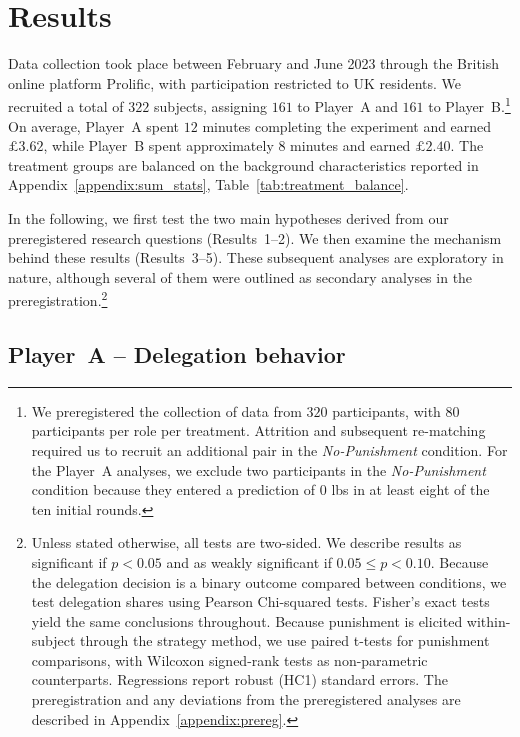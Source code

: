 \section{Results} \label{results}

Data collection took place between February and June 2023 through the British online platform Prolific, with participation restricted to UK residents. We recruited a total of $322$ subjects, assigning $161$ to Player~A and $161$ to Player~B.\footnote{We preregistered the collection of data from $320$ participants, with $80$ participants per role per treatment. Attrition and subsequent re-matching required us to recruit an additional pair in the \textit{No-Punishment} condition. For the Player~A analyses, we exclude two participants in the \textit{No-Punishment} condition because they entered a prediction of $0$ lbs in at least eight of the ten initial rounds.} On average, Player~A spent $12$ minutes completing the experiment and earned $\pounds 3.62$, while Player~B spent approximately $8$ minutes and earned $\pounds 2.40$. The treatment groups are balanced on the background characteristics reported in Appendix~\ref{appendix:sum_stats}, Table~\ref{tab:treatment_balance}.

In the following, we first test the two main hypotheses derived from our preregistered research questions (Results~1--2). We then examine the mechanism behind these results (Results~3--5). These subsequent analyses are exploratory in nature, although several of them were outlined as secondary analyses in the preregistration.\footnote{Unless stated otherwise, all tests are two-sided. We describe results as significant if $p<0.05$ and as weakly significant if $0.05 \leq p < 0.10$. Because the delegation decision is a binary outcome compared between conditions, we test delegation shares using Pearson Chi-squared tests. Fisher's exact tests yield the same conclusions throughout. Because punishment is elicited within-subject through the strategy method, we use paired t-tests for punishment comparisons, with Wilcoxon signed-rank tests as non-parametric counterparts. Regressions report robust (HC1) standard errors. The preregistration and any deviations from the preregistered analyses are described in Appendix~\ref{appendix:prereg}.}

\subsection*{Player~A -- Delegation behavior} \label{sec:result1}

